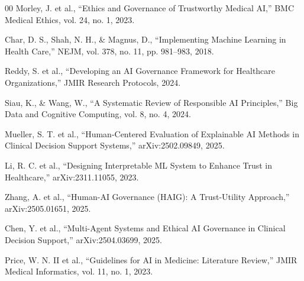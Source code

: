 \documentclass[conference]{IEEEtran}
\begin{document}
\begin{thebibliography}{00}
 Morley, J. et al., ``Ethics and Governance of Trustworthy Medical AI,'' BMC Medical Ethics, vol. 24, no. 1, 2023.

 Char, D. S., Shah, N. H., \& Magnus, D., ``Implementing Machine Learning in Health Care,'' NEJM, vol. 378, no. 11, pp. 981--983, 2018.

 Reddy, S. et al., ``Developing an AI Governance Framework for Healthcare Organizations,'' JMIR Research Protocols, 2024.

 Siau, K., \& Wang, W., ``A Systematic Review of Responsible AI Principles,'' Big Data and Cognitive Computing, vol. 8, no. 4, 2024.

 Mueller, S. T. et al., ``Human-Centered Evaluation of Explainable AI Methods in Clinical Decision Support Systems,'' arXiv:2502.09849, 2025.

 Li, R. C. et al., ``Designing Interpretable ML System to Enhance Trust in Healthcare,'' arXiv:2311.11055, 2023.

 Zhang, A. et al., ``Human-AI Governance (HAIG): A Trust-Utility Approach,'' arXiv:2505.01651, 2025.

 Chen, Y. et al., ``Multi-Agent Systems and Ethical AI Governance in Clinical Decision Support,'' arXiv:2504.03699, 2025.

 Price, W. N. II et al., ``Guidelines for AI in Medicine: Literature Review,'' JMIR Medical Informatics, vol. 11, no. 1, 2023.
\end{thebibliography}
\end{document}
